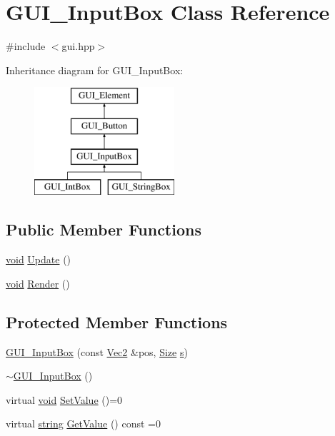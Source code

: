 \hypertarget{class_g_u_i___input_box}{\section{G\-U\-I\-\_\-\-Input\-Box Class Reference}
\label{class_g_u_i___input_box}
}


{\ttfamily \#include $<$gui.\-hpp$>$}

Inheritance diagram for G\-U\-I\-\_\-\-Input\-Box\-:\begin{figure}[H]
\begin{center}
\leavevmode
\includegraphics[height=4.000000cm]{class_g_u_i___input_box}
\end{center}
\end{figure}
\subsection*{Public Member Functions}
\begin{DoxyCompactItemize}
\item 
\hyperlink{_s_d_l__opengles2__gl2ext_8h_ae5d8fa23ad07c48bb609509eae494c95}{void} \hyperlink{class_g_u_i___input_box_a746bc2202307104665d4ab30ad995a7b}{Update} ()
\item 
\hyperlink{_s_d_l__opengles2__gl2ext_8h_ae5d8fa23ad07c48bb609509eae494c95}{void} \hyperlink{class_g_u_i___input_box_ab3f53d45c9e3e7096d2db952483eae87}{Render} ()
\end{DoxyCompactItemize}
\subsection*{Protected Member Functions}
\begin{DoxyCompactItemize}
\item 
\hyperlink{class_g_u_i___input_box_ac48716009d4e31142e82e86b6675755a}{G\-U\-I\-\_\-\-Input\-Box} (const \hyperlink{class_vec2}{Vec2} \&pos, \hyperlink{gui_8hpp_a1c40db1d9b56c27240e420765695f1c4}{Size} \hyperlink{_s_d_l__opengl_8h_a4af680a6c683f88ed67b76f207f2e6e4}{s})
\item 
\hyperlink{class_g_u_i___input_box_a79ed8e45d1569fd48b2c680232c92235}{$\sim$\-G\-U\-I\-\_\-\-Input\-Box} ()
\item 
virtual \hyperlink{_s_d_l__opengles2__gl2ext_8h_ae5d8fa23ad07c48bb609509eae494c95}{void} \hyperlink{class_g_u_i___input_box_a63a61023be84d38e03c349b260f42300}{Set\-Value} ()=0
\item 
virtual \hyperlink{_s_d_l__opengl__glext_8h_ae84541b4f3d8e1ea24ec0f466a8c568b}{string} \hyperlink{class_g_u_i___input_box_adeb1d006ee9b07917619e734266247fa}{Get\-Value} () const =0
\end{DoxyCompactItemize}
